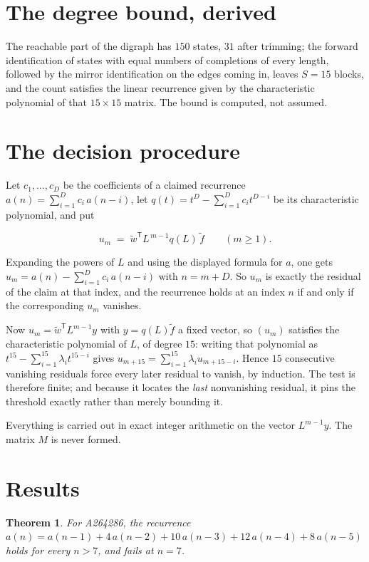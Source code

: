 \documentclass[11pt]{article}
\newtheorem{theorem}{Theorem}
\theoremstyle{definition}
\begin{document}
\section{The degree bound, derived}

The reachable part of the digraph has $150$ states, $31$ after trimming; the forward identification of states with equal numbers of completions of every length, followed by the mirror identification on the edges coming in, leaves $S = 15$ blocks, and the count satisfies the linear recurrence given by the characteristic polynomial of that $15\times15$ matrix. The bound is computed, not assumed.

\section{The decision procedure}

Let $c_1,\dots,c_D$ be the coefficients of a claimed recurrence $a(n) = \sum_{i=1}^{D} c_i\,a(n-i)$, let $q(t) = t^{D} - \sum_{i=1}^{D} c_i t^{D-i}$ be its characteristic polynomial, and put

\[u_m \;=\; \tilde w^{\mathsf T} L^{\,m-1} q(L)\,\tilde f \qquad (m \ge 1).\]

Expanding the powers of $L$ and using the displayed formula for $a$, one gets $u_m = a(n) - \sum_{i=1}^{D} c_i\,a(n-i)$ with $n = m + D$. So $u_m$ is exactly the residual of the claim at that index, and the recurrence holds at an index $n$ if and only if the corresponding $u_m$ vanishes.

Now $u_m = \tilde w^{\mathsf T} L^{m-1} y$ with $y = q(L)\tilde f$ a fixed vector, so $(u_m)$ satisfies the characteristic polynomial of $L$, of degree $15$: writing that polynomial as $t^{15} - \sum_{i=1}^{15} \lambda_i t^{15-i}$ gives $u_{m+15} = \sum_{i=1}^{15} \lambda_i u_{m+15-i}$. Hence $15$ consecutive vanishing residuals force every later residual to vanish, by induction. The test is therefore finite; and because it locates the {\itshape last} nonvanishing residual, it pins the threshold exactly rather than merely bounding it.

Everything is carried out in exact integer arithmetic on the vector $L^{m-1}y$. The matrix $M$ is never formed.

\section{Results}

\begin{theorem} For A264286, the recurrence $a(n) = a(n-1) + 4\,a(n-2) + 10\,a(n-3) + 12\,a(n-4) + 8\,a(n-5)$ holds for every $n > 7$, and fails at $n = 7$.\end{theorem}
\end{document}
